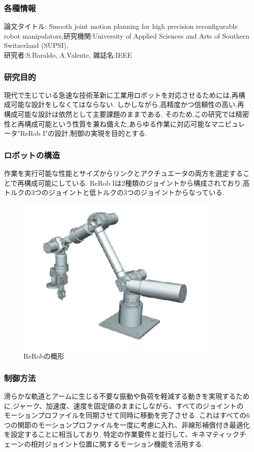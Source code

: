 \documentclass[a4paper,11pt,titlepage]{jsarticle}
\begin{document}
{\subsubsection{各種情報}
論文タイトル: Smooth joint motion planning for high precision reconfigurable robot manipulators,研究機関:University of Applied Sciences and Arts of Southern Switzerland (SUPSI),\\研究者:S.Baraldo, A.Valente, 雑誌名:IEEE
\subsubsection{研究目的}
現代で生じている急速な技術革新に工業用ロボットを対応させるためには,再構成可能な設計をしなくてはならない.
しかしながら,高精度かつ信頼性の高い,再構成可能な設計は依然として主要課題のままである.
そのため,この研究では精密性と再構成可能という性質を兼ね備えた,あらゆる作業に対応可能なマニピュレータ"ReRob I"の設計,制御の実現を目的とする.
\subsubsection{ロボットの構造}
作業を実行可能な性能とサイズからリンクとアクチュエータの両方を選定することで再構成可能にしている.
ReRob Iは2種類のジョイントから構成されており,高トルクの3つのジョイントと低トルクの3つのジョイントからなっている.

\begin{figure}[H]
  \begin{center}
    \includegraphics[width = 10cm]{画像/ReRob.png}
    \caption{ReRobの概形}
    \label{ReRob}
  \end{center}
\end{figure}

\subsubsection{制御方法}
滑らかな軌道とアームに生じる不要な振動や負荷を軽減する動きを実現するために,ジャーク、加速度、速度を固定値のままにしながら、すべてのジョイントのモーションプロファイルを同期させて同時に移動を完了させる.
これはすべての6つの関節のモーションプロファイルを一度に考慮に入れ、非線形補償付き最適化を設定することに相当しており,
特定の作業要件と並行して、キネマティックチェーンの相対ジョイント位置に関するモーション機能を活用する.

}
\end{document}
